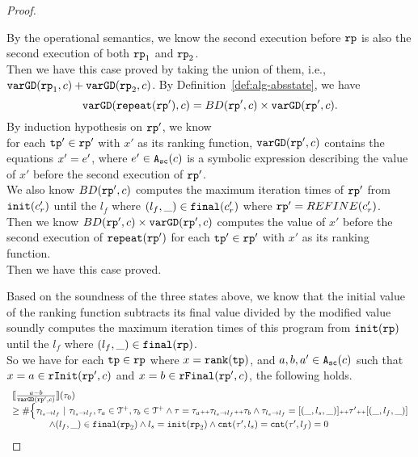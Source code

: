 \begin{proof}
\begin{itemize}
By the operational semantics, we know the second execution before $\mathtt{rp}$ is also the second execution of both $\mathtt{rp}_1$ and $\mathtt{rp}_2$.
\\
Then we have this case proved by taking the union of them, i.e., $\mathtt{varGD}(\mathtt{rp}_1, c) + \mathtt{varGD}(\mathtt{rp}_2, c)$.
 By Definition~\ref{def:alg-absstate}, we have
\[
  \mathtt{varGD}(\mathtt{repeat}(\mathtt{rp}'), c) =  BD(\mathtt{rp}', c)  \times
  {\ensuremath{\mathtt{varGD}}(\ensuremath{\mathtt{rp}}', c)}.
\]
By induction hypothesis on $\mathtt{rp}'$, we know
\\
for each $\mathtt{tp}' \in \mathtt{rp}'$ with $x'$ as its ranking function,
$\mathtt{varGD}(\mathtt{rp}', c)$ contains the equations $x' = e'$, where $e' \in {\ensuremath{\mathtt{A_{sc}}}}(c)$ is a
symbolic expression describing the value of $x'$ before the second execution of $\mathtt{rp}'$.
\\
We also know $BD(\mathtt{rp}', c)$ computes the maximum iteration times of $\mathtt{rp}'$ from $\mathtt{init}(c_r')$ until the $l_f$ where $(l_f, \_) \in \mathtt{final}(c_r')$ where $\mathtt{rp}' = REFINE(c_r')$.
\\
Then we know $BD(\mathtt{rp}', c)  \times
{\ensuremath{\mathtt{varGD}}(\ensuremath{\mathtt{rp}}', c)}$
computes the value of $x'$ before the second execution of $\mathtt{repeat}(\mathtt{rp}')$ for each $\mathtt{tp}' \in \mathtt{rp}'$ with $x'$ as its ranking function.
\\
Then we have this case proved.
\end{itemize}
Based on the soundness of the three states above, we know that the initial value of the ranking function
subtracts its final value divided by the modified value soundly computes the maximum iteration times of this program from $\mathtt{init}(\mathtt{rp})$ until the $l_f$ where $(l_f, \_) \in \mathtt{final}(\mathtt{rp})$.
\\
So we have for each $\mathtt{tp} \in \mathtt{rp}$ where $x = \mathtt{rank}(\mathtt{tp})$,
and $a, b, a ' \in {\ensuremath{\mathtt{A_{sc}}}}(c)$
such that $x = a \in \mathtt{rInit}(\mathtt{rp}', c)$ and $x = b \in \mathtt{rFinal}(\mathtt{rp}', c)$,
the following holds.
\[
  \begin{array}{l}
  \llbracket \frac{a - b}{\mathtt{varGD}(\mathtt{rp}', c)} \rrbracket(\mathtt{\tau}_0) 
  \\ \geq
    \# \Big\{\mathtt{\tau}_{l_s \to l_f} ~\vert~ \mathtt{\tau}_{l_s \to l_f}, \mathtt{\tau}_a \in \mathcal{T}^{+}, \mathtt{\tau}_b \in \mathcal{T}^{+}
    \land \mathtt{\tau} = \mathtt{\tau}_a {\scriptscriptstyle ++} \mathtt{\tau}_{l_s \to l_f} {\scriptscriptstyle ++} \mathtt{\tau}_b
    \land \mathtt{\tau}_{l_s \to l_f} = [(\_, l_s, \_)] {\scriptscriptstyle ++} \mathtt{\tau}' {\scriptscriptstyle ++} [(\_, l_f, \_)]
    \\ \qquad \qquad
    \land (l_{f}, \_) \in \mathtt{final}(\mathtt{rp}_2)
    \land l_s = \mathtt{init}(\mathtt{rp}_2)
    \land \mathtt{cnt}(\mathtt{\tau}', l_s) = \mathtt{cnt}(\mathtt{\tau}', l_f) = 0 

\end{array}\]
\end{proof}
